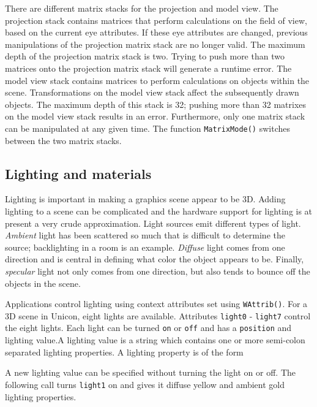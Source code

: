 There are different matrix stacks for the projection and model
view. The projection stack contains matrices that perform calculations
on the field of view, based on the current eye attributes. If these
eye attributes are changed, previous manipulations of the projection
matrix stack are no longer valid. The maximum depth of the projection
matrix stack is two. Trying to push more than two matrices onto the
projection matrix stack will generate a runtime error. The model view
stack contains matrices to perform calculations on objects within the
scene. Transformations on the model view stack affect the subsequently
drawn objects. The maximum depth of this stack is 32; pushing more
than 32 matrixes on the model view stack results in an
error. Furthermore, only one matrix stack can be manipulated at any
given time. The function \texttt{MatrixMode()} switches between the
two matrix stacks.

\subsection{Lighting and materials}

Lighting is important in making a graphics scene appear to be 3D.
Adding lighting to a scene can be complicated and the hardware support
for lighting is at present a very crude approximation. Light sources
emit different types of light. \emph{Ambient} light has been scattered
so much that is difficult to determine the source; backlighting in a
room is an example. \emph{Diffuse} light comes from one direction and
is central in defining what color the object appears to be. Finally,
\emph{specular} light not only comes from one direction, but also
tends to bounce off the objects in the scene.

Applications control lighting using context attributes set using
\texttt{WAttrib()}. For a 3D scene in Unicon, eight lights are
available. Attributes \texttt{light0} - \texttt{light7} control the
eight lights. Each light can be turned \texttt{on} or \texttt{off}
and has a \texttt{position} and lighting value.A lighting value is a
string which contains one or more semi-colon separated lighting
properties. A lighting property is of the form


\noindent
A new lighting value can be specified without turning the light on or off.
The following call turns \texttt{light1} on and gives it diffuse
yellow and ambient gold lighting properties. 

